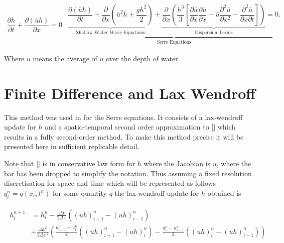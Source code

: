 \documentclass[SingleSpace,12pt,Proceedings]{Serre_ASCE}
\begin{document}
\begin{linenomath*}
\begin{subequations}\label{eq:Serre_conservative_form}
\begin{gather}
\dfrac{\partial h}{\partial t} + \dfrac{\partial (\bar{u}h)}{\partial x} = 0
\label{eq:Serre_continuity}
\end{gather}
\begin{gather}
\underbrace{\underbrace{\dfrac{\partial (\bar{u}h)}{\partial t} + \dfrac{\partial}{\partial x} \left ( \bar{u}^2h + \dfrac{gh^2}{2}\right )}_{\text{Shallow Water Wave Equations}} + \underbrace{\dfrac{\partial}{\partial x} \left (  \dfrac{h^3}{3} \left [ \dfrac{\partial \bar{u} }{\partial x} \dfrac{\partial \bar{u}}{\partial x} - \bar{u} \dfrac{\partial^2 \bar{u}}{\partial x^2}  - \dfrac{\partial^2 \bar{u}}{\partial x \partial t}\right ] \right )}_{\text{Dispersion Terms}} = 0.}_{\text{Serre Equations}}
\label{eq:Serre_momentum}
\end{gather}
\end{subequations}
\end{linenomath*}
Where $\bar{u}$ means the average of $u$ over the depth of water.
\section{Finite Difference and Lax Wendroff}
\label{section:}
This method was used in  for the Serre equations. It consists of a lax-wendroff update for $h$ and a spatio-temporal second order approximation to [] which results in a fully second-order method. To make this method precise it will be presented here in sufficient replicable detail.

Note that [] is in conservative law form for $h$ where the Jacobian is $u$, where the bar has been dropped to simplify the notation. Thus assuming a fixed resolution discretisation for space and time which will be represented as follows $q^n_i = q(x_i,t^n)$ for some quantity $q$ the lax-wendroff update for $h$ obtained is
\begin{linenomath*}
\begin{gather}
\begin{split}
h^{n+1}_i &= h^{n}_i - \frac{\Delta t}{2\Delta x} \left(\left(uh\right)^n_{i+1} - \left(uh\right)^n_{i-1}\right) \\ &+ \frac{\Delta t^2}{2\Delta x^2}\left(\frac{u^n_{i+1} - u^n_{i} }{2}\left(\left(uh\right)^n_{i+1} - \left(uh\right)^n_{i}\right) - \frac{u^n_{i} - u^n_{i-1} }{2}\left(\left(uh\right)^n_{i} - \left(uh\right)^n_{i-1}\right) \right)
\end{split}
\label{eq:LW4h}
\end{gather}
\end{linenomath*}
\end{document}
